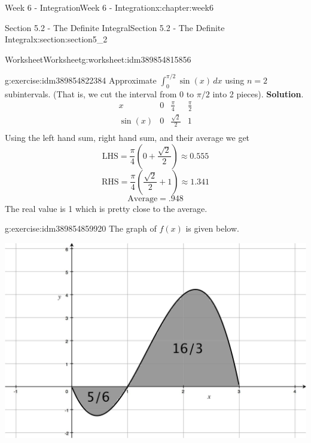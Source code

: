 \documentclass[oneside,10pt,]{book}
\newcommand{\blocktitlefont}{\relax}
\numberwithin{equation}{section}
\newcommand{\amp}{&}
\begin{document}
\begin{chapterptx}{Week 6 - Integration}{}{Week 6 - Integration}{}{}{x:chapter:week6}
\begin{sectionptx}{Section 5.2 - The Definite Integral}{}{Section 5.2 - The Definite Integral}{}{}{x:section:section5_2}
%
\begin{worksheet-subsection}{Worksheet}{}{Worksheet}{}{}{g:worksheet:idm389854815856}
\begin{divisionexercise}{1}{}{}{g:exercise:idm389854822384}%
Approximate \(\displaystyle \int_0^{\pi/2} \sin(x) \, dx\) using \(n=2\) subintervals. (That is, we cut the interval from \(0\) to \(\pi/2\) into 2 pieces).%
\textbf{\blocktitlefont Solution}.\hypertarget{g:solution:idm389854836176}{}\quad{}%
\begin{equation*}
\begin{matrix} 
x \amp 0 \amp \frac{\pi}{4} \amp \frac{\pi}{2} \\
\sin(x) \amp 0 \amp \frac{\sqrt 2}{2} \amp 1 \\
\end{matrix}
\end{equation*}
Using the left hand sum, right hand sum, and their average we get%
\begin{equation*}
\text{LHS} = \frac{\pi}{4}\left( 0 + \frac {\sqrt 2} {2} \right) \approx 0.555
\end{equation*}
%
\begin{equation*}
\text{RHS} = \frac{\pi}{4}\left( \frac {\sqrt 2} {2} +1 \right) \approx 1.341
\end{equation*}
%
\begin{equation*}
\text{Average} = .948 
\end{equation*}
The real value is 1 which is pretty close to the average.%
\end{divisionexercise}%
\begin{divisionexercise}{2}{}{}{g:exercise:idm389854859920}%
The graph of \(f(x)\) is given below.%
\begin{image}{0}{1}{0}%
\includegraphics[width=\linewidth]{images/Math140S14Wksht19G1.jpg}

\end{image}
\end{divisionexercise}
\end{worksheet-subsection}
\end{sectionptx}
\end{chapterptx}
\end{document}
